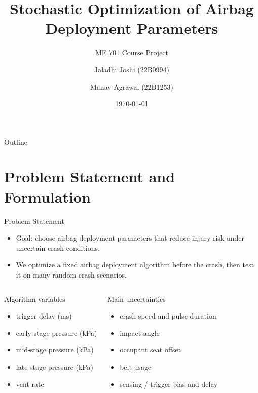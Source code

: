 \documentclass[aspectratio=169]{beamer}
\title{Stochastic Optimization of Airbag Deployment Parameters}
\subtitle{ME 701 Course Project}
\author{Jaladhi Joshi (22B0994) \and Manav Agrawal (22B1253)}
\institute{ME 701}
\date{\today}
\begin{document}
\begin{frame}
  \titlepage
\end{frame}

\begin{frame}{Outline}
  \tableofcontents
\end{frame}

\section{Problem Statement and Formulation}

\begin{frame}{Problem Statement}
  \begin{itemize}
    \item Goal: choose airbag deployment parameters that reduce injury risk under uncertain crash conditions.
    \item We optimize a fixed airbag deployment algorithm before the crash, then test it on many random crash scenarios.
  \end{itemize}

  \begin{columns}[T]
    \begin{block}{Algorithm variables}
      \begin{itemize}
        \item trigger delay (ms)
        \item early-stage pressure (kPa)
        \item mid-stage pressure (kPa)
        \item late-stage pressure (kPa)
        \item vent rate
      \end{itemize}
    \end{block}

    \begin{block}{Main uncertainties}
      \begin{itemize}
        \item crash speed and pulse duration
        \item impact angle
        \item occupant seat offset
        \item belt usage
        \item sensing / trigger bias and delay
      \end{itemize}
    \end{block}
  \end{columns}
\end{frame}
\end{document}
